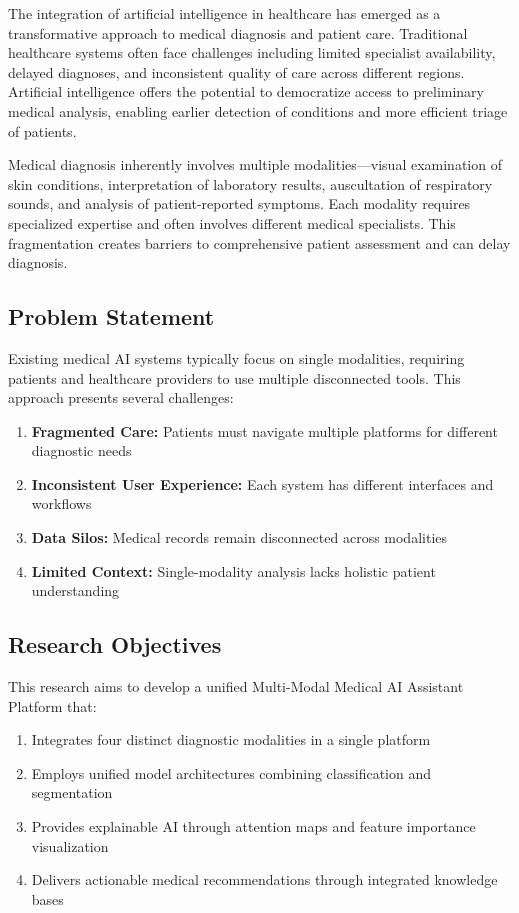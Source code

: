 \documentclass[conference]{IEEEtran}
\begin{document}
The integration of artificial intelligence in healthcare has emerged as a transformative approach to medical diagnosis and patient care. Traditional healthcare systems often face challenges including limited specialist availability, delayed diagnoses, and inconsistent quality of care across different regions. Artificial intelligence offers the potential to democratize access to preliminary medical analysis, enabling earlier detection of conditions and more efficient triage of patients.

Medical diagnosis inherently involves multiple modalities—visual examination of skin conditions, interpretation of laboratory results, auscultation of respiratory sounds, and analysis of patient-reported symptoms. Each modality requires specialized expertise and often involves different medical specialists. This fragmentation creates barriers to comprehensive patient assessment and can delay diagnosis.

\subsection{Problem Statement}

Existing medical AI systems typically focus on single modalities, requiring patients and healthcare providers to use multiple disconnected tools. This approach presents several challenges:

\begin{enumerate}
\item \textbf{Fragmented Care:} Patients must navigate multiple platforms for different diagnostic needs
\item \textbf{Inconsistent User Experience:} Each system has different interfaces and workflows
\item \textbf{Data Silos:} Medical records remain disconnected across modalities
\item \textbf{Limited Context:} Single-modality analysis lacks holistic patient understanding
\end{enumerate}

\subsection{Research Objectives}

This research aims to develop a unified Multi-Modal Medical AI Assistant Platform that:

\begin{enumerate}
\item Integrates four distinct diagnostic modalities in a single platform
\item Employs unified model architectures combining classification and segmentation
\item Provides explainable AI through attention maps and feature importance visualization
\item Delivers actionable medical recommendations through integrated knowledge bases
\end{enumerate}
\end{document}
